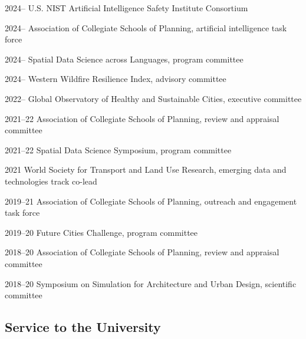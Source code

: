 \documentclass[11pt,letterpaper]{report} %
\begin{document}
    \begin{tablist}

        \item[2024--]   \tab{}U.S. NIST Artificial Intelligence Safety Institute Consortium
        \item[2024--]   \tab{}Association of Collegiate Schools of Planning, artificial intelligence task force
        \item[2024--]   \tab{}Spatial Data Science across Languages, program committee
        \item[2024--]   \tab{}Western Wildfire Resilience Index, advisory committee
        \item[2022--]   \tab{}Global Observatory of Healthy and Sustainable Cities, executive committee
        \item[2021--22] \tab{}Association of Collegiate Schools of Planning, review and appraisal committee
        \item[2021--22] \tab{}Spatial Data Science Symposium, program committee
        \item[2021]     \tab{}World Society for Transport and Land Use Research, emerging data and technologies track co-lead
        \item[2019--21] \tab{}Association of Collegiate Schools of Planning, outreach and engagement task force
        \item[2019--20] \tab{}Future Cities Challenge, program committee
        \item[2018--20] \tab{}Association of Collegiate Schools of Planning, review and appraisal committee
        \item[2018--20] \tab{}Symposium on Simulation for Architecture and Urban Design, scientific committee

    \end{tablist}

    \subsection*{Service to the University}
\end{document}
